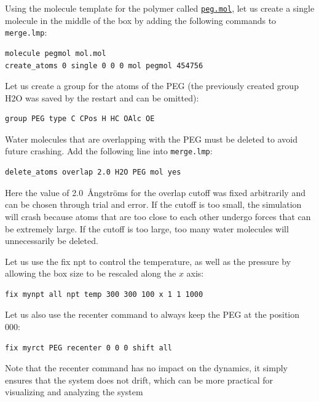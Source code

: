 \documentclass[9pt,tutorial]{livecoms}
\newcommand{\lmpcmd}[1]{\hspace{0pt}\colorbox{listing}{\textcolor{command}{\small{#1}}}\hspace{0pt}} %
\newcommand{\flecmd}[1]{\textcolor{command}{\texttt{#1}}} %
\newcommand{\dwlcmd}[1]{\textcolor{download}{\texttt{#1}}} %
\newcommand{\filepath}{https://raw.githubusercontent.com/lammpstutorials/lammpstutorials-article/main/files/}
\begin{document}
Using the molecule template for the polymer called
\href{\filepath tutorial3/peg.mol}{\dwlcmd{peg.mol}},
let us create a single molecule in the middle of the box by adding the following
commands to \flecmd{merge.lmp}:
\begin{lstlisting}
molecule pegmol mol.mol
create_atoms 0 single 0 0 0 mol pegmol 454756
\end{lstlisting}
Let us create a group for the atoms of the PEG (the previously created
group H2O was saved by the restart and can be omitted):
\begin{lstlisting}
group PEG type C CPos H HC OAlc OE
\end{lstlisting}
Water molecules that are overlapping with the PEG must be deleted to avoid future crashing.  Add the following line into \flecmd{merge.lmp}:
\begin{lstlisting}
delete_atoms overlap 2.0 H2O PEG mol yes
\end{lstlisting}
Here the value of 2.0~Ångströms for the overlap cutoff was fixed arbitrarily and can
be chosen through trial and error.  If the cutoff is too small, the simulation will
crash because atoms that are too close to each other undergo forces
that can be extremely large.  If the cutoff is too large, too many water
molecules will unnecessarily be deleted.

Let us use the \lmpcmd{fix npt} to control the temperature, as
well as the pressure by allowing the box size to be rescaled along the $x$ axis:
\begin{lstlisting}
fix mynpt all npt temp 300 300 100 x 1 1 1000
\end{lstlisting}
Let us also use the \lmpcmd{recenter} command to always keep the PEG at
the position $0 0 0$:
\begin{lstlisting}
fix myrct PEG recenter 0 0 0 shift all
\end{lstlisting}
Note that the \lmpcmd{recenter} command has no impact on the dynamics,
it simply ensures that the system does not drift, which can be more practical for visualizing and analyzing the system
\end{document}
